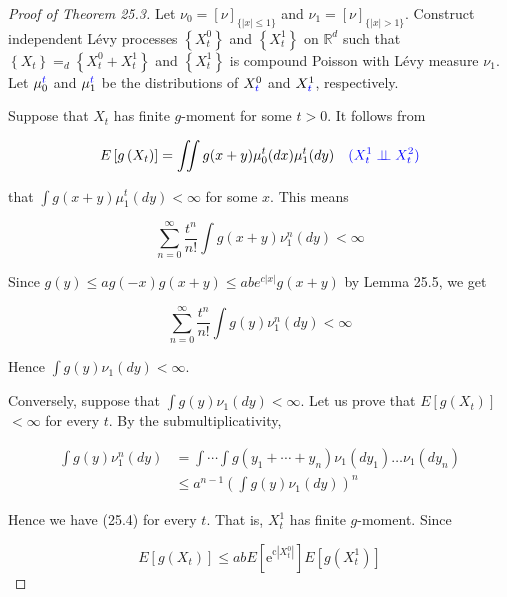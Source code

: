 \documentclass[a4paper,11pt]{article}
\begin{document}
\begin{proof}[Proof of Theorem 25.3]

    Let $\nu_{0}=[\nu]_{\{|x| \leq 1\}}$ and $\nu_{1}=[\nu]_{\{|x|>1\}}$. Construct
    independent Lévy processes $\left\{X_{t}^{0}\right\}$ and $\left\{X_{t}^{1}\right\}$ on $\mathbb{R}^{d}$ such
    that $\left\{X_{t}\right\} =_{d} \left\{X_{t}^{0}+ X_{t}^{1}\right\}$ and
    $\left\{X_{t}^{1}\right\}$ is compound Poisson with Lévy measure $\nu_{1}$. Let $\mu_{0}^{\textcolor{blue}{t}}$ and $\mu_{1}^{\textcolor{blue}{t}}$ be
    the distributions of $X_{\textcolor{blue}{t}}^{0}$ and $X_{\textcolor{blue}{t}}^{1}$, respectively.

    Suppose that $X_{t}$ has finite $g$-moment for some $t>0$. It follows from

    $$
        E\left[g\left(X_{t}\right)\right]=\iint g(x+y) \mu_{0}^{t}(dx) \mu_{1}^{t}(dy) \quad  \textcolor{blue}{(X_{t}^{1} \perp\!\!\!\perp X_{t}^{2})}
    $$

    that $\int g(x+y) \mu_{1}^{t}(dy)<\infty$ for some $x$. This means

    $$
        \sum_{n=0}^{\infty} \frac{t^{n}}{n !} \int g(x+y) \nu_{1}^{n}(dy)<\infty
    $$

    Since $g(y) \leq a g(-x) g(x+y) \leq a b e^{c|x|} g(x+y)$ by Lemma 25.5, we get


    \begin{equation*}
        \sum_{n=0}^{\infty} \frac{t^{n}}{n !} \int g(y) \nu_{1}^{n}(dy)<\infty \tag{25.4}
    \end{equation*}

    Hence $\int g(y) \nu_{1}(d y)<\infty$.

    Conversely, suppose that $\int g(y) \nu_{1}(dy)<\infty$. Let us prove
    that $E\left[g\left(X_{t}\right)\right]$ $<\infty$ for every $t$. By the submultiplicativity,

    $$
        \begin{aligned}
            \int g(y) \nu_{1}^{n}(dy) & =\int \cdots \int g\left(y_{1}+\cdots+y_{n}\right) \nu_{1}\left(dy_{1}\right) \ldots \nu_{1}\left(d y_{n}\right) \\
                                      & \leq a^{n-1}\left(\int g(y) \nu_{1}(dy)\right)^{n}
        \end{aligned}
    $$

    Hence we have (25.4) for every $t$. That is, $X_{t}^{1}$ has finite $g$-moment. Since

    $$
        E\left[g\left(X_{t}\right)\right] \leq a b E\left[\mathrm{e}^{\mathrm{c}\left|X_{t}^{0}\right|}\right] E\left[g\left(X_{t}^{1}\right)\right]
    $$


\end{proof}
\end{document}
